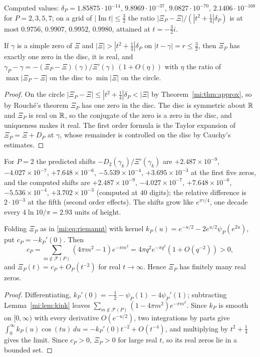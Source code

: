 Computed values: $\delta_P=1.85875\cdot10^{-14}$, $9.8969\cdot10^{-37}$, $9.0827\cdot10^{-70}$, $2.1406\cdot10^{-168}$ for $P=2,3,5,7$; on a grid of $|\operatorname{Im}t|\le\tfrac32$ the ratio $|\Xi_P-\Xi|/(|t^2+\tfrac14|\delta_P)$ is at most $0.9756$, $0.9907$, $0.9952$, $0.9980$, attained at $t=-\tfrac32i$.

\begin{corollary}\label{mi:cor:rouche}
If $\gamma$ is a simple zero of $\Xi$ and $|\Xi|>|t^2+\tfrac14|\delta_P$ on $|t-\gamma|=r\le\tfrac32$, then $\Xi_P$ has exactly one zero in the disc, it is real, and $\gamma_P-\gamma=-(\Xi_P-\Xi)(\gamma)/\Xi'(\gamma)\,(1+O(\eta))$ with $\eta$ the ratio of $\max|\Xi_P-\Xi|$ on the disc to $\min|\Xi|$ on the circle.
\end{corollary}

\begin{proof}
On the circle $|\Xi_P-\Xi|\le|t^2+\tfrac14|\delta_P<|\Xi|$ by Theorem~\ref{mi:thm:approx}, so by Rouch\'e's theorem $\Xi_P$ has one zero in the disc. The disc is symmetric about $\mathbb{R}$ and $\Xi_P$ is real on $\mathbb{R}$, so the conjugate of the zero is a zero in the disc, and uniqueness makes it real. The first order formula is the Taylor expansion of $\Xi_P=\Xi+D_P$ at $\gamma$, whose remainder is controlled on the disc by Cauchy's estimates.
\end{proof}

For $P=2$ the predicted shifts $-D_2(\gamma_k)/\Xi'(\gamma_k)$ are $+2.487\times10^{-9}$, $-4.027\times10^{-7}$, $+7.648\times10^{-6}$, $-5.539\times10^{-4}$, $+3.695\times10^{-3}$ at the first five zeros, and the computed shifts are $+2.487\times10^{-9}$, $-4.027\times10^{-7}$, $+7.648\times10^{-6}$, $-5.536\times10^{-4}$, $+3.702\times10^{-3}$ (computed at $40$ digits); the relative difference is $2\cdot10^{-3}$ at the fifth (second order effects). The shifts grow like $e^{\pi\gamma/4}$, one decade every $4\ln10/\pi=2.93$ units of height.

\begin{theorem}\label{mi:thm:kink}
Folding $\Xi_P$ as in \eqref{mi:eq:riemannt} with kernel $k_P(u)=e^{-u/2}-2e^{u/2}\psi_P(e^{2u})$, put $c_P=-k_P'(0)$. Then
\[
c_P=\sum_{m\notin\mathcal F(P)}(4\pi m^2-1)e^{-\pi m^2}=4\pi q^2e^{-\pi q^2}(1+O(q^{-2}))>0,
\]
and $\Xi_P(t)=c_P+O_P(t^{-2})$ for real $t\to\infty$. Hence $\Xi_P$ has finitely many real zeros.
\end{theorem}

\begin{proof}
Differentiating, $k_P'(0)=-\tfrac12-\psi_P(1)-4\psi_P'(1)$; subtracting Lemma~\ref{mi:lem:kink} leaves $\sum_{m\notin\mathcal F(P)}(1-4\pi m^2)e^{-\pi m^2}$. Since $k_P$ is smooth on $[0,\infty)$ with every derivative $O(e^{-u/2})$, two integrations by parts give $\int_0^\infty k_P(u)\cos(tu)\,du=-k_P'(0)t^{-2}+O(t^{-4})$, and multiplying by $t^2+\frac14$ gives the limit. Since $c_P>0$, $\Xi_P>0$ for large real $t$, so its real zeros lie in a bounded set.
\end{proof}

